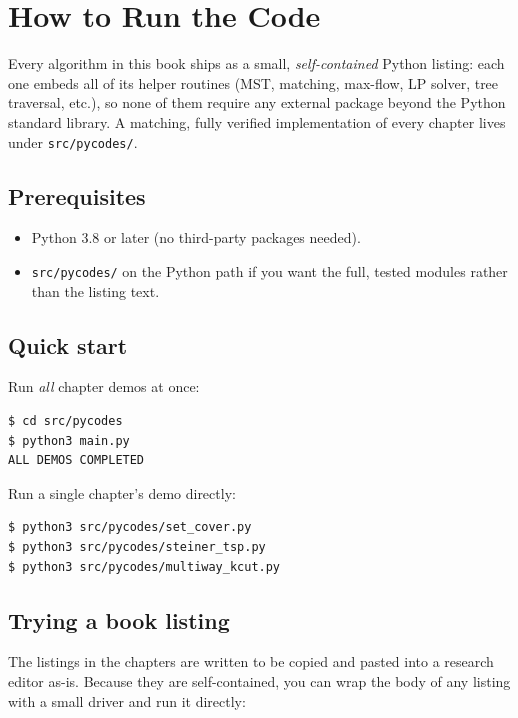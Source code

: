 \chapter{How to Run the Code}

Every algorithm in this book ships as a small, \emph{self-contained} Python
listing: each one embeds all of its helper routines (MST, matching, max-flow,
LP solver, tree traversal, etc.), so none of them require any external package
beyond the Python standard library.  A matching, fully verified implementation
of every chapter lives under \texttt{src/pycodes/}.

\section*{Prerequisites}

\begin{itemize}
  \item Python 3.8 or later (no third-party packages needed).
  \item \texttt{src/pycodes/} on the Python path if you want the full,
        tested modules rather than the listing text.
\end{itemize}

\section{Quick start}

Run \emph{all} chapter demos at once:

\begin{lstlisting}[style=python, caption=Run every verified demo]
$ cd src/pycodes
$ python3 main.py
ALL DEMOS COMPLETED
\end{lstlisting}

Run a single chapter's demo directly:

\begin{lstlisting}[style=python, caption=Run one chapter's demo]
$ python3 src/pycodes/set_cover.py
$ python3 src/pycodes/steiner_tsp.py
$ python3 src/pycodes/multiway_kcut.py
\end{lstlisting}

\section{Trying a book listing}

The listings in the chapters are written to be copied and pasted into a
research editor as-is.  Because they are self-contained, you can wrap the body
of any listing with a small driver and run it directly:


